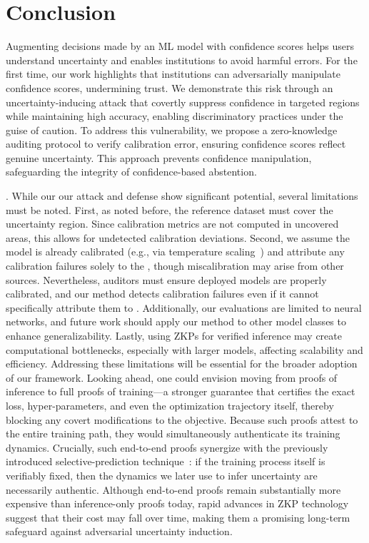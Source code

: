 \section{Conclusion}
Augmenting decisions made by an ML model with confidence scores helps users understand uncertainty and enables institutions to avoid harmful errors. For the first time, our work highlights that institutions can adversarially manipulate confidence scores, undermining trust. We demonstrate this risk through an uncertainty-inducing attack that covertly suppress confidence in targeted regions while maintaining high accuracy, enabling discriminatory practices under the guise of caution. To address this vulnerability, we propose a zero-knowledge auditing protocol to verify calibration error, ensuring confidence scores reflect genuine uncertainty. This approach prevents confidence manipulation, safeguarding the integrity of confidence-based abstention.

. While our our attack and defense show significant potential, several limitations must be noted. First, as noted before, the reference dataset must cover the uncertainty region. Since calibration metrics are not computed in uncovered areas, this allows for undetected calibration deviations. Second, we assume the model is already calibrated (e.g., via temperature scaling~\citep{guo2017calibration}) and attribute any calibration failures solely to the \attack, though miscalibration may arise from other sources. Nevertheless, auditors must ensure deployed models are properly calibrated, and our method detects calibration failures even if it cannot specifically attribute them to \attack. Additionally, our evaluations are limited to neural networks, and future work should apply our method to other model classes to enhance generalizability. Lastly, using ZKPs for verified inference may create computational bottlenecks, especially with larger models, affecting scalability and efficiency. Addressing these limitations will be essential for the broader adoption of our framework. Looking ahead, one could envision moving from proofs of inference to full proofs of training---a stronger guarantee that certifies the exact loss, hyper-parameters, and even the optimization trajectory itself, thereby blocking any covert modifications to the objective. Because such proofs attest to the entire training path, they would simultaneously authenticate its training dynamics. Crucially, such end-to-end proofs synergize with the previously introduced selective-prediction technique~\citep{rabanser2022selective}: if the training process itself is verifiably fixed, then the dynamics we later use to infer uncertainty are necessarily authentic. Although end-to-end proofs remain substantially more expensive than inference-only proofs today, rapid advances in ZKP technology suggest that their cost may fall over time, making them a promising long-term safeguard against adversarial uncertainty induction.